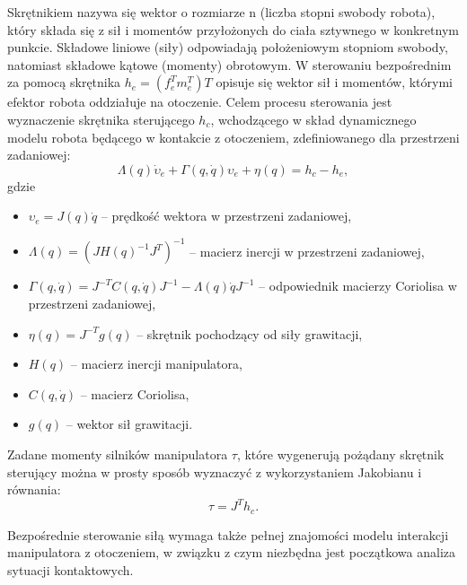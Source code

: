 \documentclass[printmode]{mgr}
\begin{document}
Skrętnikiem nazywa się wektor o rozmiarze n (liczba stopni swobody robota), który składa się z sił i momentów przyłożonych
do ciała sztywnego w konkretnym punkcie. Składowe liniowe (siły) odpowiadają położeniowym stopniom swobody, natomiast
składowe kątowe (momenty) obrotowym. W sterowaniu bezpośrednim za pomocą skrętnika $h_e = (f_e^T m_e^T)T$ opisuje się wektor sił i momentów,
którymi efektor robota oddziałuje na otoczenie. Celem procesu sterowania jest wyznaczenie skrętnika sterującego $h_c$, 
wchodzącego w skład dynamicznego modelu robota będącego w kontakcie z otoczeniem, zdefiniowanego dla przestrzeni zadaniowej:
\begin{equation}
\Lambda(q)\dot{\upsilon}_e + \Gamma(q, \dot{q})\upsilon_e + \eta(q) = h_c - h_e,
\label{eq:dynamika_w_kontakcie}
\end{equation}
gdzie
\begin{itemize}
\item $\upsilon_e = J(q)\dot{q}$ -- prędkość wektora w przestrzeni zadaniowej,
\item $\Lambda(q) = (JH(q)^{-1}J^T)^{-1}$ -- macierz inercji w przestrzeni zadaniowej,
\item $\Gamma(q, \dot{q}) = J^{-T}C(q,\dot{q})J^{-1} - \Lambda(q)\dot{q}J^{-1}$ -- odpowiednik macierzy Coriolisa w przestrzeni zadaniowej,
\item $\eta(q) = J^{-T}g(q)$ -- skrętnik pochodzący od siły grawitacji,
\item $H(q)$ -- macierz inercji manipulatora,
\item $C(q, \dot{q})$ -- macierz Coriolisa,
\item $g(q)$ -- wektor sił grawitacji.
\end{itemize}

Zadane momenty silników manipulatora $\tau$, które wygenerują pożądany skrętnik sterujący można w prosty sposób wyznaczyć z wykorzystaniem Jakobianu
i równania:
\begin{equation}
\tau = J^Th_c.
\label{eq:skretnik_sterujacy}
\end{equation}

Bezpośrednie sterowanie siłą wymaga także pełnej znajomości modelu interakcji manipulatora z otoczeniem, w związku z czym niezbędna
jest początkowa analiza sytuacji kontaktowych.
\end{document}
